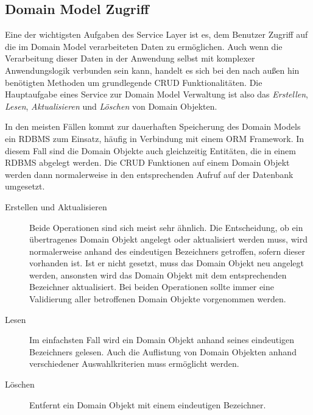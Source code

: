 \subsection{Domain Model Zugriff}\label{service:domainmodel}
Eine der wichtigsten Aufgaben des Service Layer ist es, dem Benutzer Zugriff auf
die im Domain Model verarbeiteten Daten zu ermöglichen. Auch wenn die
Verarbeitung dieser Daten in der Anwendung selbst mit komplexer Anwendungslogik
verbunden sein kann, handelt es sich bei den nach außen hin benötigten Methoden
um grundlegende \ac{CRUD} Funktionalitäten. Die Hauptaufgabe eines Service zur
Domain Model Verwaltung ist also das \emph{Erstellen}, \emph{Lesen},
\emph{Aktualisieren} und \emph{Löschen} von Domain Objekten.

In den meisten Fällen kommt zur dauerhaften Speicherung des Domain Models ein
\ac{RDBMS} zum Einsatz, häufig in Verbindung mit einem \ac{ORM} Framework. In
diesem Fall sind die Domain Objekte auch gleichzeitig Entitäten, die in einem
\ac{RDBMS} abgelegt werden. Die \ac{CRUD} Funktionen auf einem Domain Objekt
werden dann normalerweise in den entsprechenden Aufruf auf der Datenbank
umgesetzt.

\begin{description}
	\item[Erstellen und Aktualisieren] Beide Operationen sind sich meist sehr
	ähnlich. Die Entscheidung, ob ein übertragenes Domain Objekt angelegt oder
	aktualisiert werden muss, wird normalerweise anhand des eindeutigen
	Bezeichners getroffen, sofern dieser vorhanden ist. Ist er nicht
	gesetzt, muss das Domain Objekt neu angelegt werden, ansonsten wird das
	Domain Objekt mit dem entsprechenden Bezeichner aktualisiert. Bei
	beiden Operationen sollte immer eine Validierung aller betroffenen Domain
	Objekte vorgenommen werden.
	\item[Lesen] Im einfachsten Fall wird ein Domain Objekt anhand seines
	eindeutigen Bezeichners gelesen. Auch die Auflistung von Domain
	Objekten anhand verschiedener Auswahlkriterien muss ermöglicht werden.
	\item[L\"oschen] Entfernt ein Domain Objekt mit einem eindeutigen Bezeichner.
\end{description}

